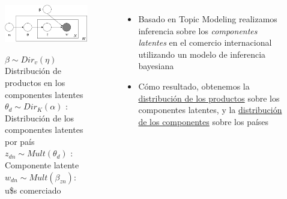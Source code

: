 \documentclass[compress]{beamer}
\begin{document}
\begin{frame}

\begin{columns}[c] 
	
	\begin{figure}
		\includegraphics[width=\linewidth]{grafo}
		
		\medskip
		\tiny
		$\beta \sim Dir_v(\eta)$  Distribución de productos en los componentes latentes\\
		$\theta_d \sim Dir_K(\alpha)$ : Distribución de los componentes latentes por país\\
		$z_{dn} \sim Mult(\theta_d)$ : Componente latente \\
		$w_{dn} \sim Mult(\beta_{zn})$: u\$s comerciado
		
	\end{figure}
	
	\small
	
	\begin{itemize}
		
		\item[\faRebel] Basado en Topic Modeling  \citep{blei2003latent} realizamos inferencia sobre los \textit{componentes latentes} en el comercio internacional utilizando un modelo de inferencia bayesiana
		\item[\faRebel] Cómo resultado, obtenemos la \underline{distribución de los productos} sobre los componentes latentes, y la \underline{distribución de los componentes} sobre los países
	\end{itemize}
	
\end{columns}
\end{frame}
\end{document}

